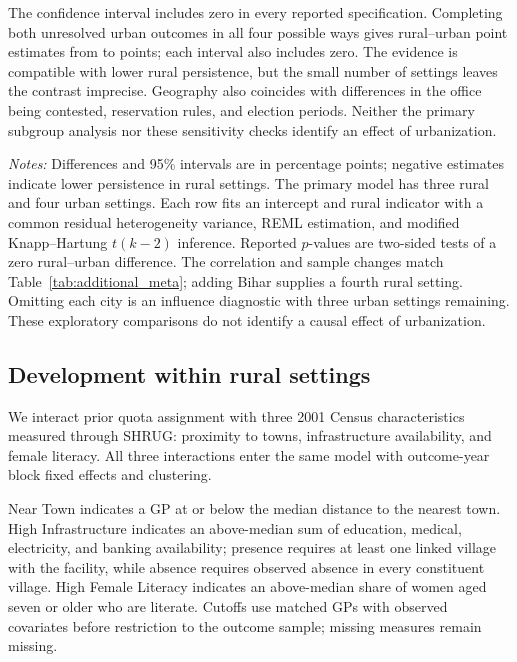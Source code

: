 The confidence interval includes zero in every reported specification. Completing both unresolved urban outcomes in all four possible ways gives rural--urban point estimates from \appRuralGapMissingLow{} to \appRuralGapMissingHigh{} points; each interval also includes zero. The evidence is compatible with lower rural persistence, but the small number of settings leaves the contrast imprecise. Geography also coincides with differences in the office being contested, reservation rules, and election periods. Neither the primary subgroup analysis nor these sensitivity checks identify an effect of urbanization.

\begin{table}[!htbp]
\centering
\caption{Direct tests of the rural--urban persistence difference}
\label{tab:additional_rural_urban}
\footnotesize
\setlength{\tabcolsep}{3pt}

\begin{minipage}{0.96\textwidth}\small
\emph{Notes:} Differences and 95\% intervals are in percentage points; negative estimates indicate lower persistence in rural settings. The primary model has three rural and four urban settings. Each row fits an intercept and rural indicator with a common residual heterogeneity variance, REML estimation, and modified Knapp--Hartung $t(k-2)$ inference. Reported $p$-values are two-sided tests of a zero rural--urban difference. The correlation and sample changes match Table~\ref{tab:additional_meta}; adding Bihar supplies a fourth rural setting. Omitting each city is an influence diagnostic with three urban settings remaining. These exploratory comparisons do not identify a causal effect of urbanization.
\end{minipage}
\end{table}
\FloatBarrier

\subsection{Development within rural settings}\label{sec:app_het}

We interact prior quota assignment with three 2001 Census characteristics measured through SHRUG: proximity to towns, infrastructure availability, and female literacy. All three interactions enter the same model with outcome-year block fixed effects and clustering.

Near Town indicates a GP at or below the median distance to the nearest town. High Infrastructure indicates an above-median sum of education, medical, electricity, and banking availability; presence requires at least one linked village with the facility, while absence requires observed absence in every constituent village. High Female Literacy indicates an above-median share of women aged seven or older who are literate. Cutoffs use matched GPs with observed covariates before restriction to the outcome sample; missing measures remain missing.

